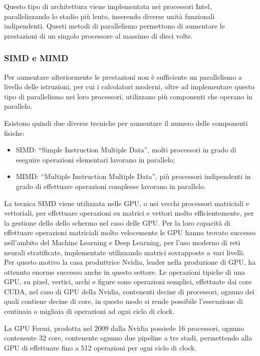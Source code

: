 \documentclass{article}
\numberwithin{equation}{subsection}
\begin{document}
Questo tipo di architettura viene implementata nei processori Intel, parallelizzando lo stadio più lento, inserendo diverse unità funzionali indipendenti. 
Questi metodi di parallelismo permettono di aumentare le prestazioni di un singolo processore al massimo di dieci volte. 

\subsubsection{SIMD e MIMD}

Per aumentare ulteriormente le prestazioni non è sufficiente un parallelismo a livello delle istruzioni, per cui i calcolatori moderni, oltre ad implementare questo tipo di parallelismo nei loro processori, 
utilizzano più componenti che operano in parallelo. 

Esistono quindi due diverse tecniche per aumentare il numero delle componenti fisiche:
\begin{itemize}
    \item SIMD: ``Simple Instruction Multiple Data'', molti processori in grado di eseguire operazioni elementari lavorano in parallelo;
    \item MIMD: ``Multiple Instruction Multiple Data'', più processori indipendenti in grado di effettuare operazioni complesse lavorano in parallelo. 
\end{itemize}

La tecnica SIMD viene utilizzata nelle GPU, o nei vecchi processori matriciali e vettoriali, per effettuare operazioni su matrici e vettori molto efficientemente, per la gestione dello dello schermo nel caso delle GPU. 
Per la loro capacità di effettuare operazioni matriciali molto velocemente le GPU hanno trovato successo nell'ambito del Machine Learning e Deep Learning, per l'uso moderno di reti neurali stratificate, implementate 
utilizzando matrici sovrapposte a vari livelli. Per questo motivo la casa produttrice Nvidia, leader nella produzione di GPU, ha ottenuto enorme successo anche in questo settore. 
Le operazioni tipiche di una GPU, su pixel, vertici, archi e figure sono operazioni semplici, effettuate dai core CUDA, nel caso di GPU della Nvidia, contenenti decine di processori, ognuno dei quali contiene 
decine di core, in questo modo si rende possibile l'esecuzione di centinaia o migliaia di operazioni ad ogni ciclo di clock. 

La GPU Fermi, prodotta nel 2009 dalla Nvidia possiede 16 processori, ognuno contenente 32 core, contenente ognuno due pipeline a tre stadi, permettendo alla GPU di effettuare fino a 512 operazioni per ogni ciclo di 
clock. 
\end{document}
